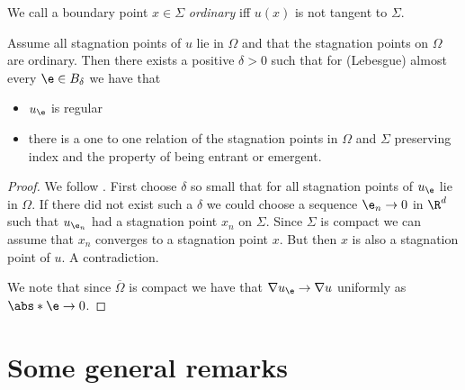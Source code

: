 We call a boundary point $x\in\Sigma$ \emph{ordinary} iff $u(x)$ is not tangent to $\Sigma$.
\begin{proposition}
  Assume all stagnation points of $u$ lie in $\Omega$ and that the stagnation points on $\Omega$ are
  ordinary. Then there exists a positive $\delta>0$ such that
  for (Lebesgue) almost every $\e\in B_\delta$ we have that
  \begin{itemize}
    \item $u_\e$ is regular
    \item there is a one to one relation of the stagnation points in $\Omega$ and $\Sigma$ preserving
      index and the property of being entrant or emergent.
  \end{itemize}
\end{proposition}
\begin{proof}
  We follow \cite[text]{Morse1970}.
  First choose $\delta$ so small that for all stagnation points of $u_\e$ lie in $\Omega$.
  If there did not exist such a $\delta$ we could choose a sequence $\e_n\to0$ in $\R^d$ such 
  that $u_{\e_n}$ had a stagnation point $x_n$ on $\Sigma$. Since $\Sigma$ is compact we can assume that $x_n$ converges
  to a stagnation point $x$. But then $x$ is also a stagnation point of $u$. A contradiction.

  
  
  We note that since $\overline{\Omega}$ is compact we have that $\nabla u_\e\to \nabla u$ 
  uniformly as $\abs*{\e}\to0$.
\end{proof}

\section{Some general remarks}

